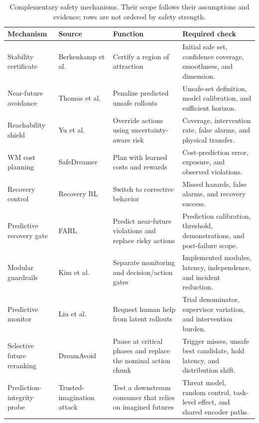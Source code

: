 \begin{table}[t]
\caption{Complementary safety mechanisms. Their scope follows their assumptions and evidence; rows are not ordered by safety strength.}
\label{tab:safety}
\small
\begin{tabularx}{\linewidth}{@{}>{\raggedright\arraybackslash}p{.18\linewidth}YYY@{}}
\toprule
Mechanism & Source & Function & Required check \\
\midrule
Stability certificate & Berkenkamp et al.~\cite{berkenkamp2017safe} & Certify a region of attraction & Initial safe set, confidence coverage, smoothness, and dimension. \\
\addlinespace
Near-future avoidance & Thomas et al.~\cite{thomas2021imagining} & Penalize predicted unsafe rollouts & Unsafe-set definition, model calibration, and sufficient horizon. \\
\addlinespace
Reachability shield & Yu et al.~\cite{yu2022drc} & Override actions using uncertainty-aware risk & Coverage, intervention rate, false alarms, and physical transfer. \\
\addlinespace
WM cost planning & SafeDreamer~\cite{huang2024safedreamer} & Plan with learned costs and rewards & Cost-prediction error, exposure, and observed violations. \\
\addlinespace
Recovery control & Recovery RL~\cite{thananjeyan2021recovery} & Switch to corrective behavior & Missed hazards, false alarms, and recovery success. \\
\addlinespace
Predictive recovery gate & FARL~\cite{li2026farl} & Predict near-future violations and replace risky actions & Prediction calibration, threshold, demonstrations, and post-failure scope. \\
\addlinespace
Modular guardrails & Kim et al.~\cite{kim2026guardrails} & Separate monitoring and decision/action gates & Implemented modules, latency, independence, and incident reduction. \\
\addlinespace
Predictive monitor & Liu et al.~\cite{liu2024runtime} & Request human help from latent rollouts & Trial denominator, supervisor variation, and intervention burden. \\
\addlinespace
Selective future reranking & DreamAvoid~\cite{fan2026dreamavoid} & Pause at critical phases and replace the nominal action chunk & Trigger misses, unsafe best candidate, hold latency, and distribution shift. \\
\addlinespace
Prediction-integrity probe & Trusted-imagination attack~\cite{chen2026trustedimagination} & Test a downstream consumer that relies on imagined futures & Threat model, random control, task-level effect, and shared encoder paths. \\

\end{tabularx}
\end{table}
